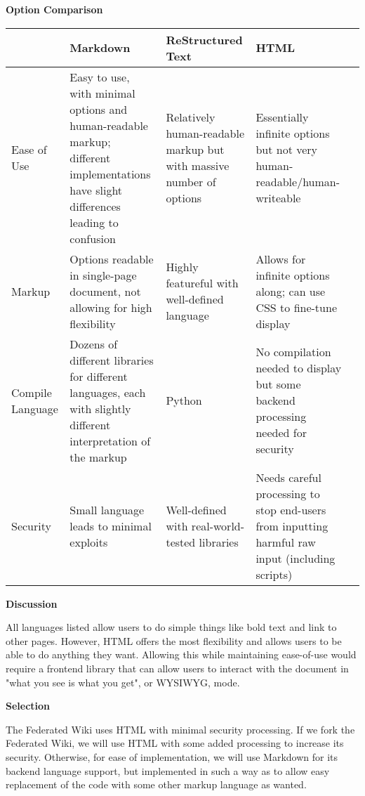 \documentclass[letterpaper, 10pt, draftclsnofoot, compsoc, onecolumn]{IEEEtran}
\begin{document}
{{\noindent\rmfamily\bfseries\color{black} Option Comparison \par}
\vspace{1pc}
\tablehead{}
\begin{supertabular}{|p{2cm}|p{2.5cm}|p{2.5cm}|p{2.5cm}|p{2.5cm}|}
\hline
  & Markdown
  & ReStructured Text
  & HTML \\ \hline
Ease of Use
  & Easy to use, with minimal options and human-readable markup; different implementations have slight differences leading to confusion
  & Relatively human-readable markup but with massive number of options
  & Essentially infinite options but not very human-readable/human-writeable  \\ \hline
Markup
  & Options readable in single-page document, not allowing for high flexibility
  & Highly featureful with well-defined language
  & Allows for infinite options along; can use CSS to fine-tune display \\ \hline
Compile Language
  & Dozens of different libraries for different languages, each with slightly different interpretation of the markup
  & Python
  & No compilation needed to display but some backend processing needed for security \\ \hline
Security
  & Small language leads to minimal exploits
  & Well-defined with real-world-tested libraries
  & Needs careful processing to stop end-users from inputting harmful raw input (including scripts)
  \\ \hline
\end{supertabular}

{\noindent\rmfamily\bfseries\color{black} Discussion \par}
{\noindent
All languages listed allow users to do simple things like bold text and link to other pages. However,
HTML offers the most flexibility and allows users to be able to do anything they want.
Allowing this while maintaining ease-of-use would require a frontend library
that can allow users to interact with the document in "what you see is what you get",
or WYSIWYG, mode.
 \par}

\medskip
{\noindent\rmfamily\bfseries\color{black} Selection \par}
{\noindent
The Federated Wiki uses HTML with minimal security processing. If we fork the Federated Wiki, we will use
HTML with some added processing to increase its security. Otherwise, for ease of implementation, we will
use Markdown for its backend language support, but implemented in such a way as to allow easy
replacement of the code with some other markup language as wanted.
\par}

}
\end{document}
